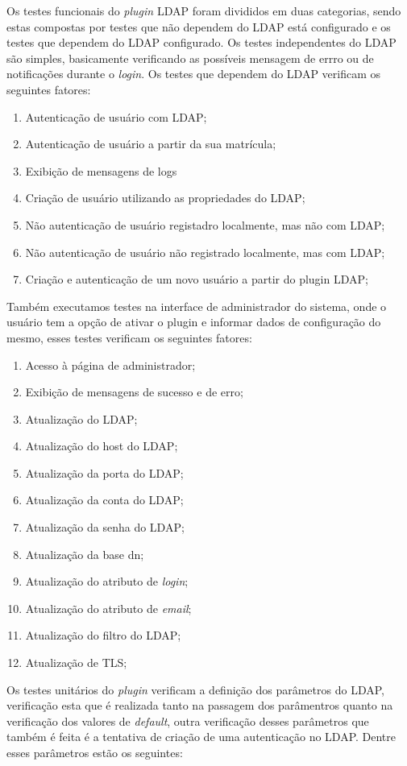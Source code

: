 Os testes funcionais do \textit{plugin} LDAP foram divididos em duas categorias, sendo estas compostas por testes que não dependem do LDAP está configurado e os testes que dependem do LDAP configurado. Os testes independentes do LDAP são simples, basicamente verificando as possíveis mensagem de errro ou de notificações durante o \textit{login}. Os testes  que dependem do LDAP verificam os seguintes fatores:
%
\begin{enumerate}
\item Autenticação de usuário com LDAP;
\item Autenticação de usuário a partir da sua matrícula;
\item Exibição de mensagens de logs
\item Criação de usuário utilizando as propriedades do LDAP;
\item Não autenticação de usuário registadro localmente, mas não com LDAP;
\item Não autenticação de usuário não registrado localmente, mas com LDAP;
\item Criação e autenticação de um novo usuário a partir do plugin LDAP;
\end{enumerate}
%
Também executamos testes na interface de administrador do sistema, onde o usuário tem a opção de ativar o plugin e informar dados de configuração do mesmo, esses testes verificam os seguintes fatores:
%
\begin{enumerate}
\item Acesso à página de administrador;
\item Exibição de mensagens de sucesso e de erro;
\item Atualização do LDAP;
\item Atualização do host do LDAP;
\item Atualização da porta do LDAP;
\item Atualização da conta do LDAP;
\item Atualização da senha do LDAP;
\item Atualização da base dn;
\item Atualização do atributo de \textit{login};
\item Atualização do atributo de \textit{email};
\item Atualização do filtro do LDAP;
\item Atualização de TLS;
\end{enumerate}

Os testes unitários do \textit{plugin} verificam a definição dos parâmetros do LDAP, verificação esta que é realizada tanto na passagem dos parâmentros quanto na verificação dos valores de \textit{default}, outra verificação desses parâmetros que também é feita é a tentativa de criação de uma autenticação no LDAP. Dentre esses parâmetros estão os seguintes:

